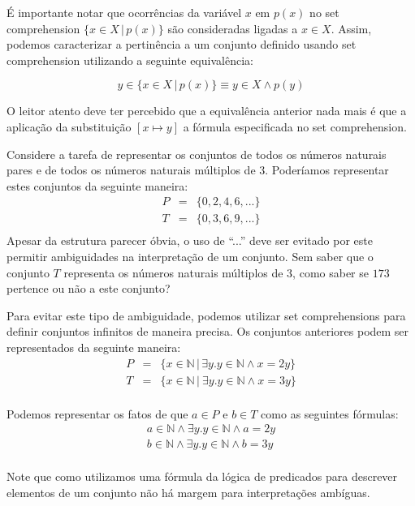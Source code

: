 É importante notar que ocorrências da variável $x$ em $p(x)$ no set
comprehension $\{x\in X\,|\,p(x)\}$ são consideradas ligadas a $x\in
X$. Assim,
podemos caracterizar a pertinência a um conjunto definido usando set
comprehension utilizando a seguinte equivalência:

\[y\in\{x\in X \,|\, p(x)\} \equiv y\in X \land p(y)\]

O leitor atento deve ter percebido que a equivalência anterior nada
mais é que a aplicação da substituição $[x\mapsto y]$ a fórmula
especificada no set comprehension.

\begin{Example}
Considere a tarefa de representar os conjuntos de todos os números naturais
pares e de todos os números naturais múltiplos de 3. Poderíamos
representar estes conjuntos da seguinte maneira:
\[
\begin{array}{lcr}
P & = &\{0,2,4,6,...\}\\
T & = & \{0,3,6,9,...\}\\
\end{array}
\]
Apesar da estrutura parecer óbvia, o uso de ``...'' deve ser evitado
por este permitir ambiguidades na interpretação de um conjunto. Sem
saber que o conjunto $T$ representa os números naturais múltiplos de
3, como saber se $173$ pertence ou não a este conjunto?

Para evitar este tipo de ambiguidade, podemos utilizar set
comprehensions para definir conjuntos infinitos de maneira precisa. Os
conjuntos anteriores podem ser representados da seguinte maneira:
\[
\begin{array}{lcr}
P & = &\{x\in\mathbb{N}\,|\,\exists y. y\in \mathbb{N}\land x =
2y\}\\
T & = & \{x\in\mathbb{N}\,|\ \exists y. y\in\mathbb{N}\land x =
3y\}\\
\end{array}
\]

Podemos representar os fatos de que $a \in P$ e $b \in T$ como as
seguintes fórmulas:
\[
\begin{array}{l}
a \in \mathbb{N} \land \exists y. y\in\mathbb{N} \land a = 2y\\
b \in \mathbb{N} \land \exists y. y\in\mathbb{N} \land b = 3y\\
\end{array}
\]

Note que como utilizamos uma fórmula da lógica de predicados para
descrever elementos de um conjunto não há margem para interpretações
ambíguas.
\end{Example}

